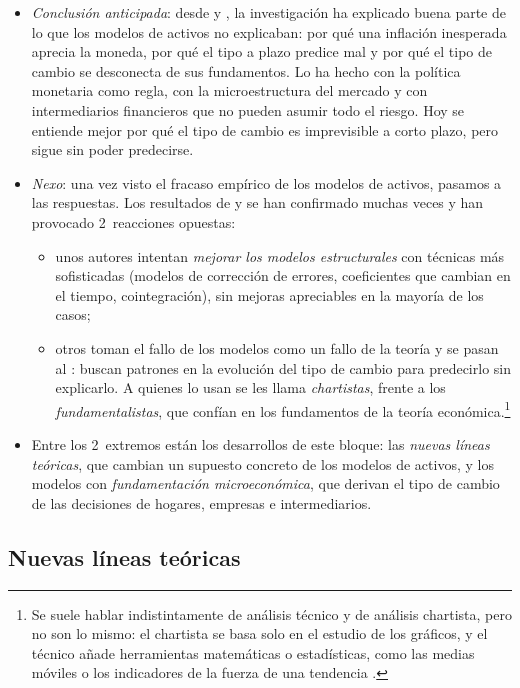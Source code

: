 \documentclass[11pt]{article}
\begin{document}
\begin{itemize}
\item \emph{Conclusión anticipada}: desde  y , la investigación ha explicado buena parte de lo que los modelos de activos no explicaban: por qué una inflación inesperada aprecia la moneda, por qué el tipo a plazo predice mal y por qué el tipo de cambio se desconecta de sus fundamentos. Lo ha hecho con la política monetaria como regla, con la microestructura del mercado y con intermediarios financieros que no pueden asumir todo el riesgo. Hoy se entiende mejor por qué el tipo de cambio es imprevisible a corto plazo, pero sigue sin poder predecirse.
\item \emph{Nexo}: una vez visto el fracaso empírico de los modelos de activos, pasamos a las respuestas. Los resultados de  y  se han confirmado muchas veces y han provocado 2~reacciones opuestas:
  \begin{itemize}
  \item unos autores intentan \emph{mejorar los modelos estructurales} con técnicas más sofisticadas (modelos de corrección de errores, coeficientes que cambian en el tiempo, cointegración), sin mejoras apreciables en la mayoría de los casos;
  \item otros toman el fallo de los modelos como un fallo de la teoría y se pasan al : buscan patrones en la evolución del tipo de cambio para predecirlo sin explicarlo. A quienes lo usan se les llama \emph{chartistas}, frente a los \emph{fundamentalistas}, que confían en los fundamentos de la teoría económica.\footnote{Se suele hablar indistintamente de análisis técnico y de análisis chartista, pero no son lo mismo: el chartista se basa solo en el estudio de los gráficos, y el técnico añade herramientas matemáticas o estadísticas, como las medias móviles o los indicadores de la fuerza de una tendencia .}
  \end{itemize}
\item Entre los 2~extremos están los desarrollos de este bloque: las \emph{nuevas líneas teóricas}, que cambian un supuesto concreto de los modelos de activos, y los modelos con \emph{fundamentación microeconómica}, que derivan el tipo de cambio de las decisiones de hogares, empresas e intermediarios.
\end{itemize}

\subsection{Nuevas líneas teóricas}\label{sec:nuevas-lineas}
\end{document}
